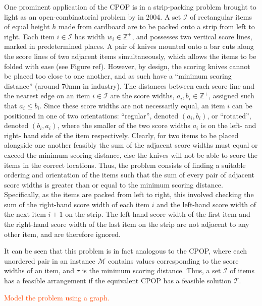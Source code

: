 \documentclass[oribibl]{llncs}
\begin{document}
One prominent application of the CPOP is in a strip-packing problem brought to light as an open-combinatorial problem by \citeauthor{goulimis2004} in 2004. A set $\mathcal{I}$ of rectangular items of equal height $h$ made from cardboard are to be packed onto a strip from left to right. Each item $i \in \mathcal{I}$ has width $w_i \in \mathbb{Z}^{+}$, and possesses two vertical score lines, marked in predetermined places. A pair of knives mounted onto a bar cuts along the score lines of two adjacent items simultaneously, which allows the items to be folded with ease (see Figure ref{}). However, by design, the scoring knives cannot be placed too close to one another, and as such have a ``minimum scoring distance'' (around 70mm in industry). The distances between each score line and the nearest edge on an item $i \in \mathcal{I}$ are the score widths, $a_i, b_i \in \mathbb{Z}^{+}$, assigned such that $a_i \leq b_i$. Since these score widths are not necessarily equal, an item $i$ can be positioned in one of two orientations: ``regular'', denoted $(a_i, b_i)$, or ``rotated'', denoted $(b_i, a_i)$, where the smaller of the two score widths $a_i$ is on the left- and right- hand side of the item respectively. Clearly, for two items to be placed alongside one another feasibly the sum of the adjacent score widths must equal or exceed the minimum scoring distance, else the knives will not be able to score the items in the correct locations. Thus, the problem consists of finding a suitable ordering and orientation of the items such that the sum of every pair of adjacent score widths is greater than or equal to the minimum scoring distance. Specifically, as the items are packed from left to right, this involved checking the sum of the right-hand score width of each item $i$ and the left-hand score width of the next item $i+1$ on the strip. The left-hand score width of the first item and the right-hand score width of the last item on the strip are not adjacent to any other item, and are therefore ignored. 

It can be seen that this problem is in fact analogous to the CPOP, where each unordered pair in an instance $\mathcal{M}$ contains values corresponding to the score widths of an item, and $\tau$ is the minimum scoring distance. Thus, a set $\mathcal{I}$ of items has a feasible arrangement if the equivalent CPOP has a feasible solution $\mathcal{T}$.




\textcolor{OrangeRed}{Model the problem using a graph.}
\end{document}
